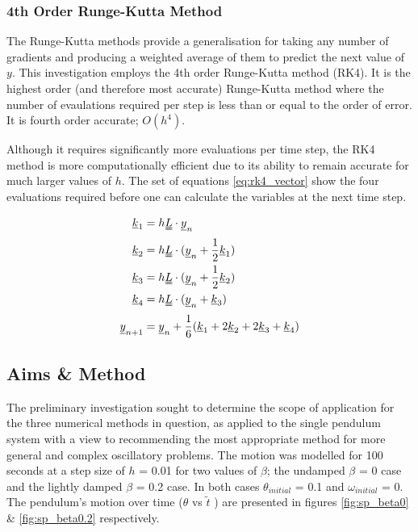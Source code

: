\documentclass[11pt]{article}
\begin{document}
\subsubsection*{4th Order Runge-Kutta Method}
The Runge-Kutta methods provide a generalisation for taking any number of gradients and producing a weighted average of them to predict the next value of $y$. This investigation employs the 4th order Runge-Kutta method (RK4). It is the highest order (and therefore most accurate) Runge-Kutta method where the number of evaulations required per step is less than or equal to the order of error. It is fourth order accurate; $O(h^4)$.

Although it requires significantly more evaluations per time step, the RK4 method is more computationally efficient due to its ability to remain accurate for much larger values of $h$. The set of equations \ref{eq:rk4_vector} show the four evaluations required before one can calculate the variables at the next time step.

\begin{equation} \label{eq:rk4_vector}
	\begin{split}
		\underline{k}_{1} &= h \uuline{L} \cdot \underline{y}_{n}  \\
		\underline{k}_{2} &= h \uuline{L} \cdot ( \underline{y}_{n} + \frac{1}{2} \underline{k}_{1}) \\
		\underline{k}_{3} &= h \uuline{L} \cdot ( \underline{y}_{n} + \frac{1}{2} \underline{k}_{2}) \\
		\underline{k}_{4} &= h \uuline{L} \cdot ( \underline{y}_{n} + \underline{k}_{3}) \\
		\underline{y}_{n+1} &= \underline{y}_{n} + \frac{1}{6} ( \underline{k}_{1} + 2\underline{k}_{2} + 2\underline{k}_{3} + \underline{k}_{4})
	\end{split}
\end{equation}

\subsection{Aims \& Method}
The preliminary investigation sought to determine the scope of application for the three numerical methods in question, as applied to the single pendulum system with a view to recommending the most appropriate method for more general and complex oscillatory problems. The motion was modelled for 100 seconds at a step size of $h$ = 0.01 for two values of $\beta$; the undamped $\beta$ = 0 case and the lightly damped $\beta$ = 0.2 case. In both cases $\theta_{initial}$ = 0.1 and $\omega_{initial}$ = 0. The pendulum's motion over time ($\theta$ vs $\widetilde{t}$ \space) are presented in figures \ref{fig:sp_beta0} \& \ref{fig:sp_beta0.2} respectively.
\end{document}
